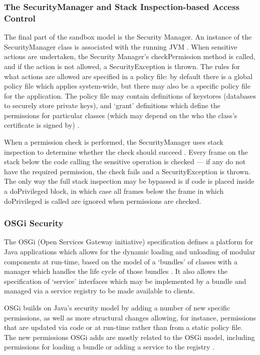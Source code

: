 \subsubsection{The SecurityManager and Stack Inspection-based Access Control}

The final part of the sandbox model is the Security Manager. An instance of the SecurityManager class is associated with the running JVM \cite{gosling2014java}. When sensitive actions are undertaken, the Security Manager's checkPermission method is called, and if the action is not allowed, a SecurityException is thrown. The rules for what actions are allowed are specified in a policy file: by default there is a global policy file which applies system-wide, but there may also be a specific policy file for the application. The policy file may contain definitions of keystores (databases to securely store private keys), and `grant' definitions which define the permissions for particular classes (which may depend on the who the class's certificate is signed by) \cite{gosling2014java}.

When a permission check is performed, the SecurityManager uses stack inspection to determine whether the check should succeed \cite{gong2003javasecurity}. Every frame on the stack below the code calling the sensitive operation is checked --- if any do not have the required permission, the check fails and a SecurityException is thrown. The only way the full stack inspection may be bypassed is if code is placed inside a doPrivileged block, in which case \cite{gong2003javasecurity} all frames below the frame in which doPrivileged is called are ignored when permissions are checked.


\subsubsection{OSGi Security}

The OSGi (Open Services Gateway initiative) specification defines a platform for Java applications which allows for the dynamic loading and unloading of modular components at run-time, based on the model of a `bundles' of classes with a manager which handles the life cycle of those bundles \cite{osgi2014osgi}. It also allows the specification of `service' interfaces which may be implemented by a bundle and managed via a service registry to be made available to clients.

OSGi builds on Java's security model by adding a number of new specific permissions, as well as more structural changes allowing, for instance, permissions that are updated via code or at run-time rather than from a static policy file. The new permissions OSGi adds are mostly related to the OSGi model, including permissions for loading a bundle or adding a service to the registry \cite{hall2011osgi}.

